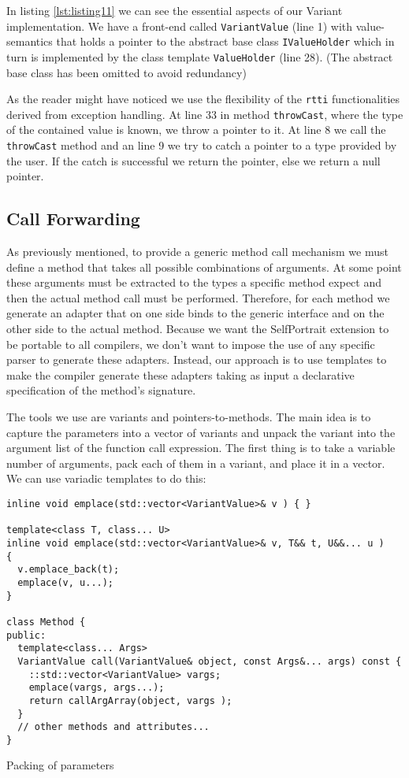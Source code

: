 In listing \ref{lst:listing11} we can see the essential aspects of our Variant implementation. We have a front-end called \texttt{VariantValue} (line 1)
with value-semantics that holds a pointer to the abstract base class \texttt{IValueHolder} which in turn is implemented by the class template
\texttt{ValueHolder} (line 28). (The abstract base class has been omitted to avoid redundancy)

As the reader might have noticed we use the flexibility of the \texttt{rtti} functionalities derived from exception handling.
At line 33 in method \texttt{throwCast}, where the type of the contained value is known, we throw a pointer to it. At line 8
we call the \texttt{throwCast} method and an line 9 we try to catch a pointer to a type provided by the user. If the catch is
successful we return the pointer, else we return a null pointer.

\subsection{Call Forwarding}

As previously mentioned, to provide a generic method call mechanism we must define a method that takes all possible combinations of arguments.
At some point these arguments must be extracted to the types a specific method expect and then the actual method call must be performed.
Therefore, for each method we generate an adapter that on one side binds to the generic interface and on the other side to the actual method.
Because we want the SelfPortrait extension to be portable to all compilers, we don't want to impose the use of any specific parser to generate
these adapters. Instead, our approach is to use templates to make the compiler generate these adapters taking as input a declarative specification
of the method's signature.

The tools we use are variants and pointers-to-methods. The main idea is to capture the parameters into a vector of variants and unpack the variant
into the argument list of the function call expression. The first thing is to take a variable number of arguments, pack each of them in a variant,
and place it in a vector. We can use variadic templates to do this:

\begin{listing}[H]
\begin{verbatim}
inline void emplace(std::vector<VariantValue>& v ) { }

template<class T, class... U>
inline void emplace(std::vector<VariantValue>& v, T&& t, U&&... u )
{
  v.emplace_back(t);
  emplace(v, u...);
}

class Method {
public:
  template<class... Args>
  VariantValue call(VariantValue& object, const Args&... args) const {
    ::std::vector<VariantValue> vargs;
    emplace(vargs, args...);
    return callArgArray(object, vargs );
  }
  // other methods and attributes...
}
\end{verbatim}
\caption{Packing of parameters}
\label{lst:listing6}
\end{listing}

